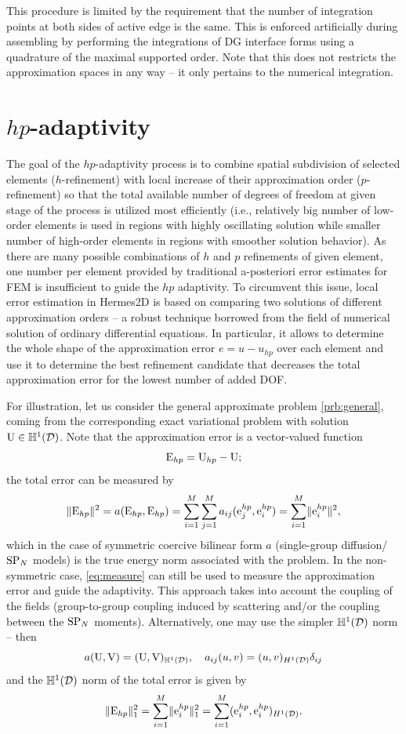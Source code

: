 This procedure is limited by the requirement that the number of integration points at both sides of
active edge is the same. This is enforced artificially during assembling by performing the integrations of DG interface
forms using a quadrature of the maximal supported order. Note that this does not restricts the approximation spaces
in any way -- it only pertains to the numerical integration.

\section{$hp$-adaptivity}\label{sec:hermes_adapt}
The goal of the $hp$-adaptivity process is to combine spatial subdivision of selected elements ($h$-refinement) with
local increase of their approximation order ($p$-refinement) so that the total available number of degrees of freedom at
given stage of the process is utilized most efficiently (i.e., relatively big number of low-order elements is used in
regions with highly oscillating solution while smaller number of high-order elements in regions with smoother solution
behavior). As there are many possible combinations of $h$ and $p$ refinements of given element, one number per element
provided by traditional a-posteriori error estimates for FEM is insufficient to guide the $hp$ adaptivity. To circumvent
this issue, local error estimation in Hermes2D is based on comparing two solutions of different approximation orders --
a robust technique borrowed from the field of numerical solution of ordinary differential equations. In particular, it
allows to determine the whole shape of the approximation error $e = u - u_{hp}$ over each element and use it to determine the best
refinement candidate that decreases the total approximation error for the lowest number of added DOF.

For illustration, let us consider the general approximate problem \ref{prb:general}, coming from the corresponding exact
variational problem with solution $\U\in\mathbb{H}^1(\VV)$. Note that the approximation error is a vector-valued
function 
$$ 
	\Ehp = \U_{hp} - \U; 
$$ 
the total error can be measured by 
\begin{equation}\label{eq:measure}
\norm{\Ehp}^2 = a(\Ehp,\Ehp) =
	\sum_{i=1}^M\sum_{j=1}^M a_{ij}(\ehp{j}, \ehp{i}) = \sum_{i=1}^M \norm{\ehp{i}}^2, 
\end{equation}
which in the case of symmetric coercive bilinear form $a$ (single-group diffusion/$\SPN$ models) is the true energy norm
associated with the problem. In the non-symmetric case, \eqref{eq:measure} can still be used to measure the
approximation error and guide the adaptivity. This approach takes into account the coupling of the fields
(group-to-group coupling induced by scattering and/or the coupling between the $\SPN$ moments). Alternatively, one may
use the simpler $\mathbb{H}^1(\VV)$ norm  -- then
$$
	a(\U,\mathrm{V}) = (\U,\mathrm{V})_{\mathbb{H}^1(\VV)},\quad a_{ij}(u,v) =
	(u,v)_{H^1(\VV)}\kron{i}{j}
$$
and the $\mathbb{H}^1(\VV)$ norm of the total error is given by
$$
	\norm[1]{\Ehp}^2 = \sum_{i=1}^M \norm[1]{\ehp{i}}^2 = \sum_{i=1}^M (\ehp{i},\ehp{i})_{H^1(\VV)}.
$$

